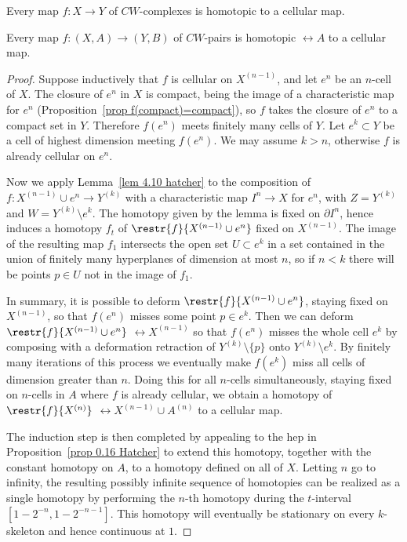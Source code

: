 \begin{thm}\label{thm cell approx}
    Every map $f:X\to Y$ of $CW$-complexes is homotopic to a cellular map. 

    Every map $f:(X,A)\to (Y,B)$ of $CW$-pairs is homotopic $\rel A$ to a cellular map.
\end{thm}
\begin{proof}
    Suppose inductively that $f$ is cellular on $X^{(n-1)}$, and let $e^n$ be an $n$-cell of $X$. The closure of $e^n$ in $X$ is compact, being the image of a characteristic map for $e^n$ (Proposition~\ref{prop f(compact)=compact}), so $f$ takes the closure of $e^n$ to a compact set in $Y$.  Therefore $f(e^n)$ meets finitely many cells of $Y$.  Let $e^k\subset Y$ be a cell of highest dimension meeting $f(e^n)$. We may assume $k>n$, otherwise $f$ is already cellular on $e^n$.

    Now we apply Lemma~\ref{lem 4.10 hatcher} to the composition of $f:X^{(n-1)}\cup e^n\to Y^{(k)}$ with a characteristic map $I^n\to X$ for $e^n$, with $Z=Y^{(k)}$ and $W=Y^{(k)}\setminus e^k$. The homotopy given by the lemma is fixed on $\partial I^n$, hence induces a homotopy $f_t$ of $\restr{f}{X^{(n-1)}\cup e^n}$ fixed on $X^{(n-1)}$. The image of the resulting map $f_1$ intersects the open set $U\subset e^k$ in a set contained in the union of finitely many hyperplanes of dimension at most $n$, so if $n<k$ there will be points $p\in U$ not in the image of $f_1$. 
    
    In summary, it is possible to deform $\restr{f}{X^{(n-1)}\cup e^n}$, staying fixed on $X^{(n-1)}$, so that $f(e^n)$ misses some point $p\in e^k$. Then we can deform $\restr{f}{X^{(n-1)}\cup e^n}$ $\rel X^{(n-1)}$ so that $f(e^n)$ misses the whole cell $e^k$ by composing with a deformation retraction of $Y^{(k)}\setminus \{p\}$ onto $Y^{(k)}\setminus e^k$. By finitely many iterations of this process we eventually make $f(e^k)$ miss all cells of dimension greater than $n$. Doing this for all $n$-cells simultaneously, staying fixed on $n$-cells in $A$ where $f$ is already cellular, we obtain a homotopy of $\restr{f}{X^{(n)}}$ $\rel X^{(n-1)}\cup A^{(n)}$ to a cellular map. 

    The induction step is then completed by appealing to the \gls{hep} in Proposition~\ref{prop 0.16 Hatcher} to extend this homotopy, together with the constant homotopy on $A$, to a homotopy defined on all of $X$. Letting $n$ go to infinity, the resulting possibly infinite sequence of homotopies can be realized as a single homotopy by performing the $n$-th homotopy during the $t$-interval $[1-2^{-n},1-2^{-n-1}]$. This homotopy will eventually be stationary on every $k$-skeleton and hence continuous at $1$.
\end{proof}

